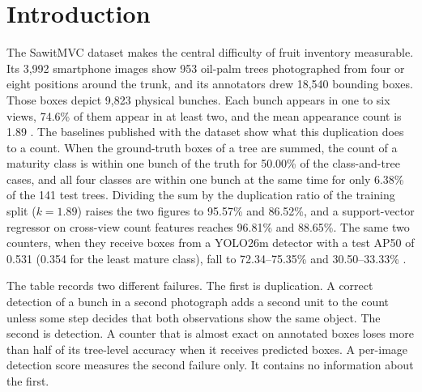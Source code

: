 \section{Introduction}

The SawitMVC dataset makes the central difficulty of fruit inventory measurable. Its 3{,}992 smartphone images show 953 oil-palm trees photographed from four or eight positions around the trunk, and its annotators drew 18{,}540 bounding boxes. Those boxes depict 9{,}823 physical bunches. Each bunch appears in one to six views, 74.6\% of them appear in at least two, and the mean appearance count is 1.89 \cite{indriani2026sawitmvc}. The baselines published with the dataset show what this duplication does to a count. When the ground-truth boxes of a tree are summed, the count of a maturity class is within one bunch of the truth for 50.00\% of the class-and-tree cases, and all four classes are within one bunch at the same time for only 6.38\% of the 141 test trees. Dividing the sum by the duplication ratio of the training split ($k=1.89$) raises the two figures to 95.57\% and 86.52\%, and a support-vector regressor on cross-view count features reaches 96.81\% and 88.65\%. The same two counters, when they receive boxes from a YOLO26m detector with a test AP50 of 0.531 (0.354 for the least mature class), fall to 72.34--75.35\% and 30.50--33.33\% \cite{indriani2026sawitmvc}.

The table records two different failures. The first is duplication. A correct detection of a bunch in a second photograph adds a second unit to the count unless some step decides that both observations show the same object. The second is detection. A counter that is almost exact on annotated boxes loses more than half of its tree-level accuracy when it receives predicted boxes. A per-image detection score measures the second failure only. It contains no information about the first.

